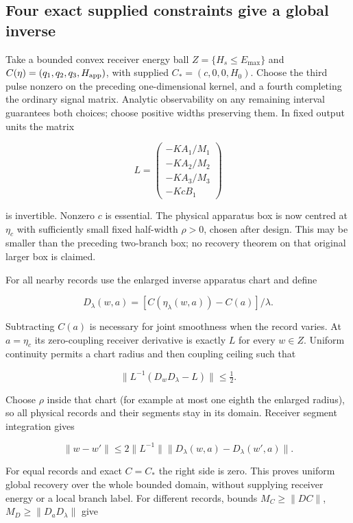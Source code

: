 \documentclass[11pt,a4paper]{article}
\begin{document}
\hypertarget{four-exact-supplied-constraints-give-a-global-inverse}{%
\subsection{Four exact supplied constraints give a global
inverse}\label{four-exact-supplied-constraints-give-a-global-inverse}}

Take a bounded convex receiver energy ball \(Z=\{H_s\le E_{\max}\}\) and
\(C(\eta)=(q_1,q_2,q_3,H_{\rm app})\), with supplied
\(C_*=(c,0,0,H_0)\). Choose the third pulse nonzero on the preceding
one-dimensional kernel, and a fourth completing the ordinary signal
matrix. Analytic observability on any remaining interval guarantees both
choices; choose positive widths preserving them. In fixed output units
the matrix

\[L=\begin{pmatrix}-KA_1/M_1\\-KA_2/M_2\\-KA_3/M_3\\-KcB_1\end{pmatrix}\]

is invertible. Nonzero \(c\) is essential. The physical apparatus box is
now centred at \(\eta_c\) with sufficiently small fixed half-width
\(\rho>0\), chosen after design. This may be smaller than the preceding
two-branch box; no recovery theorem on that original larger box is
claimed.

For all nearby records use the enlarged inverse apparatus chart and
define

\[D_\lambda(w,a)=
 [C(\eta_\lambda(w,a))-C(a)]/\lambda.\]

Subtracting \(C(a)\) is necessary for joint smoothness when the record
varies. At \(a=\eta_c\) its zero-coupling receiver derivative is exactly
\(L\) for every \(w\in Z\). Uniform continuity permits a chart radius
and then coupling ceiling such that

\[\|L^{-1}(D_wD_\lambda-L)\|\le\tfrac12.\]

Choose \(\rho\) inside that chart (for example at most one eighth the
enlarged radius), so all physical records and their segments stay in its
domain. Receiver segment integration gives

\[\|w-w'\|\le2\|L^{-1}\|
 \|D_\lambda(w,a)-D_\lambda(w',a)\|.\]

For equal records and exact \(C=C_*\) the right side is zero. This
proves uniform global recovery over the whole bounded domain, without
supplying receiver energy or a local branch label. For different
records, bounds \(M_C\ge\|DC\|\), \(M_D\ge\|D_aD_\lambda\|\) give
\end{document}
